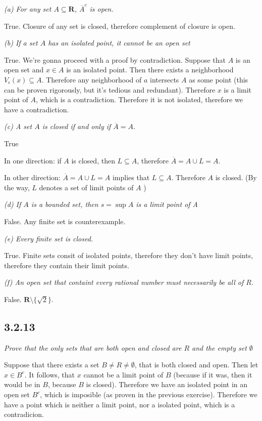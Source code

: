 \documentclass[11pt,oneside,titlepage]{book}
\begin{document}
\textit{(a) For any set $A \subseteq \textbf{R}$, $\overline A^c$ is open.}

True. Closure of any set is closed, therefore complement of closure is open.

\textit{(b) If a set $A$ has an isolated point, it cannot be an open set}

True. We're gonna proceed with a proof by contradiction.
Suppose that $A$ is an open set and $x \in A$ is an isolated point. Then there
exists a neighborhood $V_\epsilon(x) \subseteq A$. Therefore any neighborhood
of $a$ intersects $A$ as some point (this can be proven rigorously, but it's
tedious and redundant). Therefore $x$ is a limit point of $A$, which is a
contradiction. Therefore it is not isolated, therefore we have a contradiction.

\textit{(c) A set $A$ is closed if and only if $\overline A = A$.}

True

In one direction: if $A$ is closed, then $L \subseteq A$, therefore
$\overline A = A \cup L  = A$.

In other direction: $\overline A = A \cup L  = A$ implies that $L \subseteq A$.
Therefore $A$ is closed. (By the way, $L$ denotes a set of limit points of $A$ )

\textit{(d) If $A$ is a bounded set, then $s = \sup A$ is a limit point of A}

False. Any finite set is counterexample.

\textit{(e) Every finite set is closed.}

True. Finite sets consit of isolated points, therefore they don't have limit
points, therefore they contain their limit points.

\textit{(f) An open set that containt every rational number must necessarily be
  all of $R$.}

False. $\textbf{R} \setminus \{\sqrt{2}\}$.

\subsection*{3.2.13}
\textit{Prove that the only sets that are both open and closed are $R$ and
  the empty set $\emptyset$}

Suppose that there exists a set $B \neq R \neq \emptyset$, that is both
closed and open. Then let $x \in B^c$. It follows, that $x$ cannot be a limit
point of $B$ (because if it was, then it would be in $B$, because $B$ is closed).
Therefore we have an isolated point in an open set $B^c$, which is imposible
(as proven in the previous exercise). Therefore we have a point which is
neither a limit point, nor a isolated point, which is a contradicion.
\end{document}
